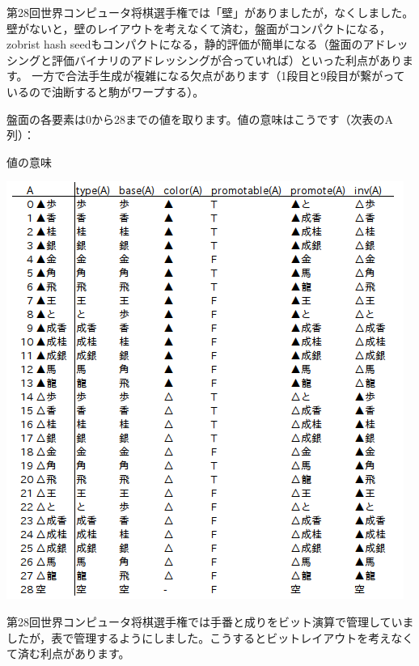 \documentclass[a4paper]{ltjsarticle}
\begin{document}
第28回世界コンピュータ将棋選手権では「壁」がありましたが，なくしました。
壁がないと，壁のレイアウトを考えなくて済む，盤面がコンパクトになる，zobrist hash seedもコンパクトになる，静的評価が簡単になる（盤面のアドレッシングと評価バイナリのアドレッシングが合っていれば）といった利点があります。
一方で合法手生成が複雑になる欠点があります（1段目と9段目が繋がっているので油断すると駒がワープする）。

盤面の各要素は0から28までの値を取ります。値の意味はこうです（次表のA列）：

\begin{table}[H]
  \centering
  \caption{値の意味}
  \includegraphics{fig2.png}
\end{table}

第28回世界コンピュータ将棋選手権では手番と成りをビット演算で管理していましたが，表で管理するようにしました。こうするとビットレイアウトを考えなくて済む利点があります。
\end{document}
